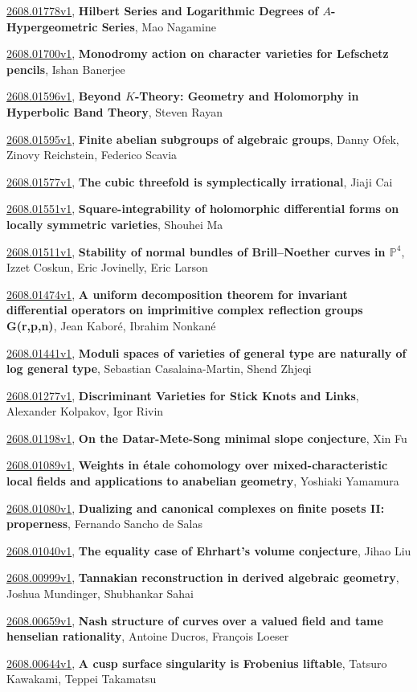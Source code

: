 \documentclass[9pt, a4paper]{article}
\theoremstyle{plain}
\theoremstyle{definition}
\theoremstyle{remark}
\newcommand{\arxiv}[3]{\href{https://arxiv.org/abs/#1}{#1}, \textbf{\textcolor{arxivblue}{#2}}, #3}
\begin{document}
\arxiv{2608.01778v1}{Hilbert Series and Logarithmic Degrees of $A$-Hypergeometric Series}{Mao Nagamine}

\arxiv{2608.01700v1}{Monodromy action on character varieties for Lefschetz pencils}{Ishan Banerjee}

\arxiv{2608.01596v1}{Beyond $K$-Theory: Geometry and Holomorphy in Hyperbolic Band Theory}{Steven Rayan}

\arxiv{2608.01595v1}{Finite abelian subgroups of algebraic groups}{Danny Ofek, Zinovy Reichstein, Federico Scavia}

\arxiv{2608.01577v1}{The cubic threefold is symplectically irrational}{Jiaji Cai}

\arxiv{2608.01551v1}{Square-integrability of holomorphic differential forms on locally symmetric varieties}{Shouhei Ma}

\arxiv{2608.01511v1}{Stability of normal bundles of Brill--Noether curves in $\mathbb{P}^4$}{Izzet Coskun, Eric Jovinelly, Eric Larson}

\arxiv{2608.01474v1}{A uniform decomposition theorem for invariant differential operators on imprimitive complex reflection groups G(r,p,n)}{Jean Kaboré, Ibrahim Nonkané}

\arxiv{2608.01441v1}{Moduli spaces of varieties of general type are naturally of log general type}{Sebastian Casalaina-Martin, Shend Zhjeqi}

\arxiv{2608.01277v1}{Discriminant Varieties for Stick Knots and Links}{Alexander Kolpakov, Igor Rivin}

\arxiv{2608.01198v1}{On the Datar-Mete-Song minimal slope conjecture}{Xin Fu}

\arxiv{2608.01089v1}{Weights in étale cohomology over mixed-characteristic local fields and applications to anabelian geometry}{Yoshiaki Yamamura}

\arxiv{2608.01080v1}{Dualizing and canonical complexes on finite posets II: properness}{Fernando Sancho de Salas}

\arxiv{2608.01040v1}{The equality case of Ehrhart's volume conjecture}{Jihao Liu}

\arxiv{2608.00999v1}{Tannakian reconstruction in derived algebraic geometry}{Joshua Mundinger, Shubhankar Sahai}

\arxiv{2608.00659v1}{Nash structure of curves over a valued field and tame henselian rationality}{Antoine Ducros, François Loeser}

\arxiv{2608.00644v1}{A cusp surface singularity is Frobenius liftable}{Tatsuro Kawakami, Teppei Takamatsu}
\end{document}
